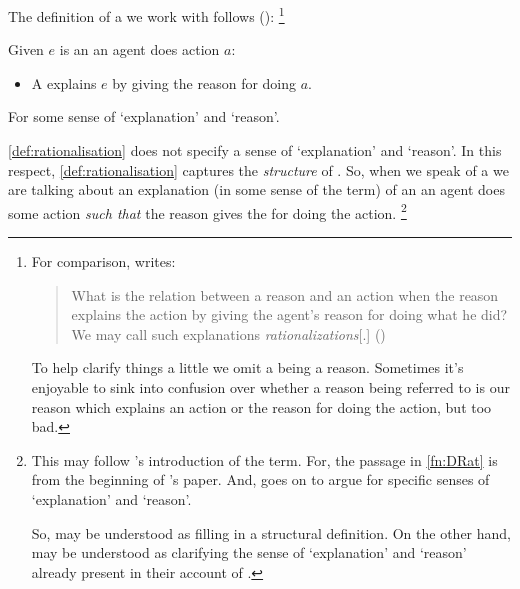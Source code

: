 \begin{note}
  The definition of a  we work with follows (\cite{Davidson:1963aa}):%
  \footnote{
    \label{fn:DRat}
    For comparison, \citeauthor{Davidson:1963aa} writes:
    \begin{quote}
      What is the relation between a reason and an action when the reason explains the action by giving the agent's reason for doing what he did?
      We may call such explanations \emph{rationalizations}[.]%
      \mbox{}\hfill\mbox{(\citeyear[685]{Davidson:1963aa})}
    \end{quote}
    To help clarify things a little we omit a \rationalisation{} being a reason.
    Sometimes it's enjoyable to sink into confusion over whether a reason being referred to is our reason which explains an action or the \agents{} reason for doing the action, but too bad.
  }

  \begin{definition}[\rationalisation{3}]%
    \label{def:rationalisation}%
    Given \(e\) is an  an agent does action \(a\):
    \begin{itemize}
    \item
      A \emph{} explains \(e\) by giving the \agents{} reason for doing \(a\).
    \end{itemize}
    For some sense of `explanation' and `reason'.
  \end{definition}

  \noindent%
  \autoref{def:rationalisation} does not specify a sense of `explanation' and `reason'.
  In this respect, \autoref{def:rationalisation} captures the \emph{structure} of .
  So, when we speak of a  we are talking about an explanation (in some sense of the term) of an \eiw{} an agent does some action \emph{such that} the reason gives the \agents{} for doing the action.%
  \footnote{
    This may follow \citeauthor{Davidson:1963aa}'s introduction of the term.
    For, the passage in \autoref{fn:DRat} is from the beginning of \citeauthor{Davidson:1963aa}'s paper.
    And, \citeauthor{Davidson:1963aa} goes on to argue for specific senses of `explanation' and `reason'.

    So, \citeauthor{Davidson:1963aa} may be understood as filling in a structural definition.
    On the other hand, \citeauthor{Davidson:1963aa} may be understood as clarifying the sense of `explanation' and `reason' already present in their account of .

}
\end{note}
